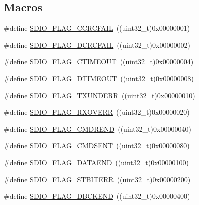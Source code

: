 \subsection*{Macros}
\begin{DoxyCompactItemize}
\item 
\#define \hyperlink{group___s_d_i_o___flags_ga8ff1f3960378e05ec3c949940e1c49d0}{S\+D\+I\+O\+\_\+\+F\+L\+A\+G\+\_\+\+C\+C\+R\+C\+F\+A\+IL}~((uint32\+\_\+t)0x00000001)
\item 
\#define \hyperlink{group___s_d_i_o___flags_ga6de936ea11cbc79444d519268ad9f9bd}{S\+D\+I\+O\+\_\+\+F\+L\+A\+G\+\_\+\+D\+C\+R\+C\+F\+A\+IL}~((uint32\+\_\+t)0x00000002)
\item 
\#define \hyperlink{group___s_d_i_o___flags_ga7389f64ff6cfa4f459bf852b5faede30}{S\+D\+I\+O\+\_\+\+F\+L\+A\+G\+\_\+\+C\+T\+I\+M\+E\+O\+UT}~((uint32\+\_\+t)0x00000004)
\item 
\#define \hyperlink{group___s_d_i_o___flags_ga2d2fd219dd9fea522862195ab9568345}{S\+D\+I\+O\+\_\+\+F\+L\+A\+G\+\_\+\+D\+T\+I\+M\+E\+O\+UT}~((uint32\+\_\+t)0x00000008)
\item 
\#define \hyperlink{group___s_d_i_o___flags_gabd18f8e5d5387a38dccbe1bf28ae5dbc}{S\+D\+I\+O\+\_\+\+F\+L\+A\+G\+\_\+\+T\+X\+U\+N\+D\+E\+RR}~((uint32\+\_\+t)0x00000010)
\item 
\#define \hyperlink{group___s_d_i_o___flags_gad49d60039e40d31b734cfacf90caa84f}{S\+D\+I\+O\+\_\+\+F\+L\+A\+G\+\_\+\+R\+X\+O\+V\+E\+RR}~((uint32\+\_\+t)0x00000020)
\item 
\#define \hyperlink{group___s_d_i_o___flags_ga083531db75a1e4c05c47578763d53af1}{S\+D\+I\+O\+\_\+\+F\+L\+A\+G\+\_\+\+C\+M\+D\+R\+E\+ND}~((uint32\+\_\+t)0x00000040)
\item 
\#define \hyperlink{group___s_d_i_o___flags_gac81f3837aac17a6aed7310a8ea460f17}{S\+D\+I\+O\+\_\+\+F\+L\+A\+G\+\_\+\+C\+M\+D\+S\+E\+NT}~((uint32\+\_\+t)0x00000080)
\item 
\#define \hyperlink{group___s_d_i_o___flags_gaaacb2f6207c149e05f8bdd70e5d49926}{S\+D\+I\+O\+\_\+\+F\+L\+A\+G\+\_\+\+D\+A\+T\+A\+E\+ND}~((uint32\+\_\+t)0x00000100)
\item 
\#define \hyperlink{group___s_d_i_o___flags_gae83f7cb3fa1183898131f3de47c2333e}{S\+D\+I\+O\+\_\+\+F\+L\+A\+G\+\_\+\+S\+T\+B\+I\+T\+E\+RR}~((uint32\+\_\+t)0x00000200)
\item 
\#define \hyperlink{group___s_d_i_o___flags_ga5452d8033567821709bd7d5f06547b70}{S\+D\+I\+O\+\_\+\+F\+L\+A\+G\+\_\+\+D\+B\+C\+K\+E\+ND}~((uint32\+\_\+t)0x00000400)
\item 

\end{DoxyCompactItemize}
